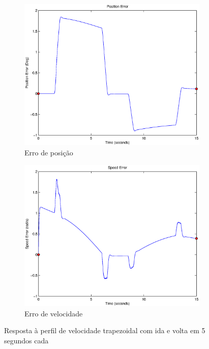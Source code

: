 \documentclass{article}
\begin{document}
\begin{figure}[H]
\begin{subfigure}{0.3\textwidth}
		\includegraphics[width=\linewidth]{matlab/ep5}
		\caption{Erro de posição}
	\end{subfigure}
	\begin{subfigure}{0.3\textwidth}
		\includegraphics[width=\linewidth]{matlab/ew5}
		\caption{Erro de velocidade}
	\end{subfigure}
	\caption{Resposta à perfil de velocidade trapezoidal com ida e volta em 5 segundos cada}	
	\label{fig:sim5res}
\end{figure}
\end{document}
